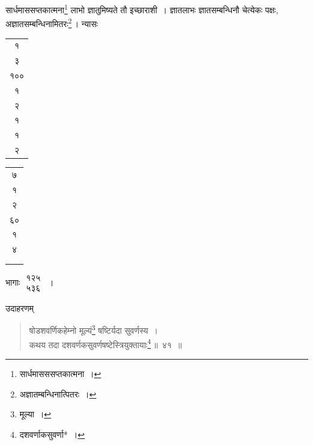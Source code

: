 \documentclass[10pt, openany]{book}
\begin{document}
{{\newpage

{सार्धमाससप्तकात्मना\renewcommand{\thefootnote}{\s १}\footnote{\s सार्धमासससप्तकात्मना~।} लाभो ज्ञातुमिष्यते तौ इच्छाराशी~। ज्ञातलाभः
ज्ञातसम्बन्धिनौ}
{चेत्येकः पक्षः, अज्ञातसम्बन्धिनामितरः\renewcommand{\thefootnote}{\s २}\footnote{\s अज्ञातम्बन्धिनात्पितरः~।}\,। न्यासः\textendash} 

 \vspace{0.3cm}
\hspace{40mm} \begin{tabular}{c|}
 १ \\३ \\ १०० \\ १ \\ २ \\ १ \\ १ \\२ 
  \end{tabular}
  \begin{tabular}{c}
 ७ \\ १ \\  २ \\६० \\१ \\ ४ \\ \\ \\
  \end{tabular}

{भागाः $\begin{matrix}

\mbox{{१२५}}\\

\mbox{{५३६}}

\end{matrix}$~।}
\vspace{2mm}

{उदाहरणम्\textemdash}

\begin{quote}
    
{\eg  षोडशवर्णिकहेम्नो मूल्यं\renewcommand{\thefootnote}{\s ५}\footnote{\s मूल्या~।} षष्टिर्यदा सुवर्णस्य~। \\
 कथय तदा दशवर्णकसुवर्णषष्टेस्त्रियुक्तायाः\renewcommand{\thefootnote}{\s ६}\footnote{\s दशवर्णाकसुवर्णा*~।}\,॥~४१~॥}\end{quote}

}}
\end{document}
